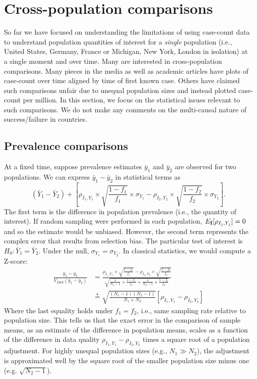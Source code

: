 \documentclass[11pt]{amsart}
\def\I{\bf I}
\begin{document}
\section{Cross-population comparisons}

So far we have focused on understanding the limitations of using case-count data to understand population quantities of interest for a \emph{single} population (i.e., United States, Germany, France or Michigan, New York, London in isolation) at a single moment and over time.  Many are interested in cross-population comparisons.  Many pieces in the media as well as academic articles have plots of case-count over time aligned by time of first known case.  Others have claimed such comparisons unfair due to unequal population sizes and instead plotted case-count per million.  In this section, we focus on the statistical issues relevant to such comparisons. We do not make any comments on the multi-causal nature of success/failure in countries.

\subsection{Prevalence comparisons}

At a fixed time, suppose prevalence estimates $\bar y_1$ and $\bar y_2$ are observed for two populations. We can express $\bar y_1 - \bar y_2$ in statistical terms as
$$
(\bar Y_1 - \bar Y_2) + \left[ \rho_{I_1, Y_1} \times \sqrt{\frac{1-f_1}{f_1}} \times \sigma_{Y_1}  - \rho_{I_2, Y_2} \times \sqrt{\frac{1-f_2}{f_2}} \times \sigma_{Y_2} \right].
$$
The first term is the difference in population prevalence (i.e., the quantity of interest).  If random sampling were performed in each population, $E_{\I} [ \rho_{I_j, Y_j}] = 0$ and so the estimate would be unbiased.  However, the second term represents the complex error that results from selection bias.
The particular test of interest is $H_0: \bar Y_1 = \bar Y_2$.  Under the null, $\sigma_{Y_1} = \sigma_{Y_2}$.  In classical statistics, we would compute a Z-score:
$$
\begin{aligned}
\frac{\bar y_1 - \bar y_2}{ V_{SRS} (\bar y_1 - \bar y_2) } &=
\frac{\rho_{I_1, Y_1} \times \sqrt{\frac{1-f_1}{f_1}}  - \rho_{I_2, Y_2} \times \sqrt{\frac{1-f_2}{f_2}} }{ \sqrt{\frac{1}{N_1 -1} \times \frac{1-f_1}{f_1} + \frac{1}{N_2 - 1} \times \frac{1-f_2}{f_2}} }  \\
&\overset{\star}{=}
\sqrt{\frac{(N_1-1)(N_2 -1)}{N_1 + N_2}} \left[ \rho_{I_1, Y_1} - \rho_{I_2, Y_2} \right]
\end{aligned}
$$
Where the last equality holds under $f_1 = f_2$, i.e., same sampling rate relative to population size. This tells us that the exact error in the comparison of sample means, as an estimate of the difference in population means, scales as a function of the difference in data quality $\rho_{I_1, Y_1} - \rho_{I_2, Y_2}$ times a square root of a population adjustment.  For highly unequal population sizes (e.g., $N_1 \gg N_2$), the adjustment is approximated well by the square root of the smaller population size minus one (e.g. $\sqrt{N_2 -1}$).
\end{document}
